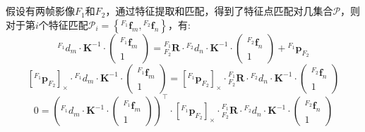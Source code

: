 \documentclass[12pt, onecolumn]{article}
\title{\normf{基于本质矩阵的两视图初始化}}
\author{\normf{陈烁龙}}
\date{\normf{\today}}
\newcommand\normf{\fangsong}
\newcommand\liehat[1]{\left[ #1 \right]_\times}
\begin{document}
	
	\maketitle
	\thispagestyle{empty}
	\clearpage
	
	\tableofcontents
	\newpage
	\listoffigures
	\newpage
	\listoftables
	
	\clearpage
	\setcounter{page}{1}
	
	\section{\normf{基础矩阵}}
	\normf
	假设有两帧影像$F_1$和$F_2$，通过特征提取和匹配，得到了特征点匹配对几集合$\mathcal{P}$，则对于第$i$个特征匹配$\mathcal{P}_i=\left\lbrace {^{F_1}\boldsymbol{f}_m},{^{F_2}\boldsymbol{f}_n}\right\rbrace $，有:
	\begin{equation}
	{^{F_1}d_m}\cdot\boldsymbol{K}^{-1}\cdot\begin{pmatrix}
	{^{F_1}\boldsymbol{f}_m}\\1
	\end{pmatrix}=
	{^{F_1}_{F_2}\boldsymbol{R}}\cdot{^{F_2}d_n}\cdot\boldsymbol{K}^{-1}\cdot\begin{pmatrix}
	{^{F_2}\boldsymbol{f}_n}\\1
	\end{pmatrix}+{^{F_1}\boldsymbol{p}_{F_2}}
	\end{equation}
	\begin{equation}
	\liehat{^{F_1}\boldsymbol{p}_{F_2}}\cdot{^{F_1}d_m}\cdot\boldsymbol{K}^{-1}\cdot\begin{pmatrix}
	{^{F_1}\boldsymbol{f}_m}\\1
	\end{pmatrix}=\liehat{^{F_1}\boldsymbol{p}_{F_2}}\cdot
	{^{F_1}_{F_2}\boldsymbol{R}}\cdot{^{F_2}d_n}\cdot\boldsymbol{K}^{-1}\cdot\begin{pmatrix}
	{^{F_2}\boldsymbol{f}_n}\\1
	\end{pmatrix}
	\end{equation}
	\begin{equation}
	0=\left( {^{F_1}d_m}\cdot\boldsymbol{K}^{-1}\cdot\begin{pmatrix}
	{^{F_1}\boldsymbol{f}_m}\\1
	\end{pmatrix}\right)^\top \cdot
	\liehat{^{F_1}\boldsymbol{p}_{F_2}}\cdot
	{^{F_1}_{F_2}\boldsymbol{R}}\cdot{^{F_2}d_n}\cdot\boldsymbol{K}^{-1}\cdot\begin{pmatrix}
	{^{F_2}\boldsymbol{f}_n}\\1
	\end{pmatrix}
	\end{equation}
\end{document}
